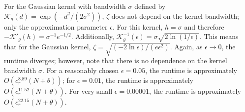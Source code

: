 

For the Gaussian kernel with bandwidth $\sigma$ defined by $\mathcal{K}_g(d) =
\exp(-d^2 / (2 \sigma^2))$, $\zeta$ does not
depend on the kernel bandwidth; only
the approximation parameter $\epsilon$.  For this kernel, $h = \sigma$ and
therefore $-\mathcal{K}'_g(h) = \sigma^{-1} e^{-1 / 2}$.  Additionally,
$\mathcal{K}_g^{-1}(\epsilon) = \sigma \sqrt{2 \ln (1 / \epsilon)}$.  This means
that for the Gaussian kernel, $\zeta = \sqrt{(-2 \ln \epsilon) / (e
\epsilon^2)}$.  Again, as $\epsilon \to 0$, the
runtime diverges; however, note that there is no dependence on the kernel
bandwidth $\sigma$.  For a reasonably chosen $\epsilon = 0.05$, the runtime is
approximately $O(c_r^{8.89} (N + \theta))$; for $\epsilon = 0.01$, the runtime
is approximately $O(c_r^{11.52} (N + \theta))$.  For very small $\epsilon =
0.00001$, the runtime is approximately $O(c_r^{22.15} (N + \theta))$.


%
%
%

